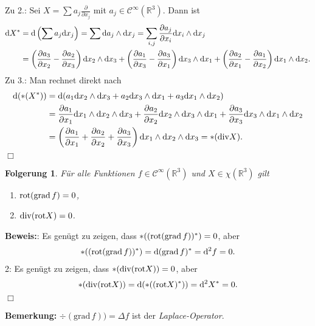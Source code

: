 \documentclass[12pt,a4paper]{article}
\def\R{\mathbb{R}}
\def\grad{\mathrm{grad}\,}
\newtheorem{Folgerung}[Lemma]{Folgerung}
\def\proof{\noindent\textbf{Beweis:}\quad}
\def\qed{\quad\hfill\ensuremath{\Box}}
\begin{document}
Zu 2.: Sei $X= \sum a_j \frac{\partial}{\partial x_j}$ mit $a_j\in \mathcal
C^\infty(\R^3)$. Dann ist
\begin{align*}
\mathrm{d} X^* &= \mathrm{d}\left( \sum a_j \mathrm{d}x_j \right)
= \sum \mathrm{d} a_j \wedge \mathrm{d}x_j  = 
\sum_{i,j} \frac{\partial a_j}{\partial x_i} \mathrm{d}x_i\wedge \mathrm{d}x_j\\
&= \left(\frac{\partial a_3}{\partial x_2} - \frac{\partial a_2}{\partial x_3}
\right)\mathrm{d}x_2\wedge \mathrm{d}x_3 +
\left(\frac{\partial a_1}{\partial x_3} - \frac{\partial a_3}{\partial x_1}
\right)\mathrm{d}x_3\wedge \mathrm{d}x_1 + 
\left(\frac{\partial a_2}{\partial x_1} - \frac{\partial a_1}{\partial x_2}
\right)\mathrm{d}x_1\wedge \mathrm{d}x_2.
\end{align*}
Zu 3.: Man rechnet direkt nach
\begin{align*}
\mathrm{d}(*(X^*)) &= \mathrm{d}( a_1 \mathrm{d}x_2\wedge \mathrm{d}x_3 + a_2\mathrm{d}x_3\wedge\mathrm{d}x_1 + a_3
\mathrm{d}x_1\wedge \mathrm{d}x_2 )\\
&= \frac{\partial a_1}{\partial x_1} \mathrm{d}x_1\wedge\mathrm{d}x_2\wedge \mathrm{d}x_3
+ \frac{\partial a_2}{\partial x_2} \mathrm{d}x_2\wedge\mathrm{d}x_3\wedge \mathrm{d}x_1
+ \frac{\partial a_3}{\partial x_3} \mathrm{d}x_3\wedge\mathrm{d}x_1\wedge \mathrm{d}x_2\\
&=\left( \frac{\partial a_1}{\partial x_1} 
+ \frac{\partial a_2}{\partial x_2} 
+ \frac{\partial a_3}{\partial x_3}  \right)
\mathrm{d}x_1\wedge\mathrm{d}x_2\wedge \mathrm{d}x_3
= *(\mathrm{div} X).
\end{align*}
\qed

\bigskip

\begin{Folgerung}
F\"ur alle Funktionen $f\in\mathcal C^\infty(\R^3)$ und $X\in\chi(\R^3)$ gilt
\begin{enumerate}
  \item $\rot(\grad f) = 0$,
  \item $\mathrm{div}(\mathrm{rot} X) = 0$.
\end{enumerate}
\end{Folgerung}

\proof
1: Es gen\"ugt zu zeigen, dass $*((\rot(\grad f))^*) = 0$, aber
\begin{align*}
*((\rot(\grad f))^*) = \diffd (\grad f)^* = \diffd^2 f = 0.
\end{align*}
2: Es gen\"ugt zu zeigen, dass $*(\mathrm{div}(\mathrm{rot} X)) = 0$, aber
\begin{align*}
*(\mathrm{div}(\mathrm{rot} X)) = \mathrm{d}(*((\mathrm{rot} X)^*)) = \mathrm{d}^2 X^* =0.
\end{align*}
\qed

\bigskip

{\bf Bemerkung:}
$\div(\grad f )) = \Delta f$ ist der \emph{Laplace-Operator}.
\end{document}

